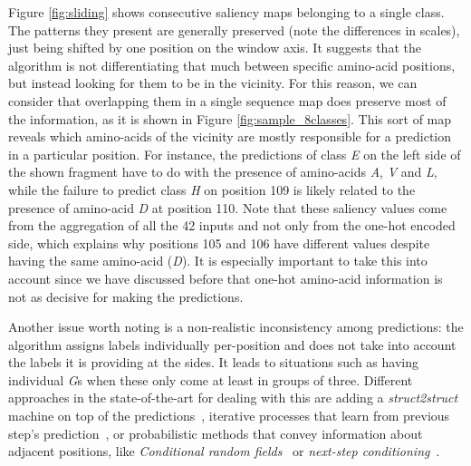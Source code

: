 

Figure \ref{fig:sliding} shows consecutive saliency maps belonging to a single class. The patterns they present are generally preserved (note the differences in scales), just being shifted by one position on the window axis. It suggests that the algorithm is not differentiating that much between specific amino-acid positions, but instead looking for them to be in the vicinity. For this reason, we can consider that overlapping them in a single sequence map does preserve most of the information, as it is shown in Figure \ref{fig:sample_8classes}. This sort of map reveals which amino-acids of the vicinity are mostly responsible for a prediction in a particular position. For instance, the predictions of class \textit{E} on the left side of the shown fragment have to do with the presence of amino-acids \textit{A}, \textit{V} and \textit{L}, while the failure to predict class \textit{H} on position 109 is likely related to the presence of amino-acid \textit{D} at position 110. Note that these saliency values come from the aggregation of all the 42 inputs and not only from the one-hot encoded side, which explains why positions 105 and 106 have different values despite having the same amino-acid (\textit{D}). It is especially important to take this into account since we have discussed before that one-hot amino-acid information is not as decisive for making the predictions.

Another issue worth noting is a non-realistic inconsistency among predictions: the algorithm assigns labels individually per-position and does not take into account the labels it is providing at the sides. It leads to situations such as having individual \textit{G}s when these only come at least in groups of three. Different approaches in the state-of-the-art for dealing with this are adding a \textit{struct2struct} machine on top of the predictions~\cite{Rost1993,Fang2017}, iterative processes that learn from previous step's prediction~\cite{Heffernan2017}, or probabilistic methods that convey information about adjacent positions, like \textit{Conditional random fields}~\cite{Wang2016} or \textit{next-step conditioning}~\cite{Busia2017}.

